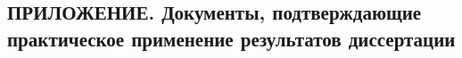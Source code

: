 \documentclass[_00_dissertation.tex]{subfiles}
\begin{document}
\onlyinsubfile{
    \renewcommand{\contentsname}{ОГЛАВЛЕНИЕ}
    \setcounter{tocdepth}{3}
    \tableofcontents
}

\begin{center}
    \chapter*{ПРИЛОЖЕНИЕ. Документы, подтверждающие практическое применение результатов диссертации}\label{section:Appendix_counterexample}
\end{center}


\onlyinsubfile{
    
    
}
\end{document}
